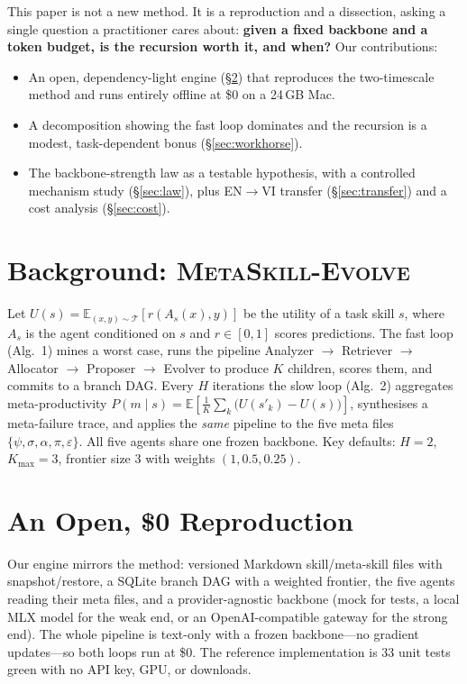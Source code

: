 \documentclass[11pt]{article}
\newcommand{\metaskill}{\textsc{MetaSkill-Evolve}}
\begin{document}
This paper is not a new method. It is a reproduction and a dissection, asking a
single question a practitioner cares about: \textbf{given a fixed backbone and a
token budget, is the recursion worth it, and when?} Our contributions:
\begin{itemize}
  \item An open, dependency-light engine (\S\ref{sec:engine}) that reproduces the
  two-timescale method and runs entirely offline at \$0 on a 24\,GB Mac.
  \item A decomposition showing the fast loop dominates and the recursion is a
  modest, task-dependent bonus (\S\ref{sec:workhorse}).
  \item The backbone-strength law as a testable hypothesis, with a controlled
  mechanism study (\S\ref{sec:law}), plus EN$\rightarrow$VI transfer
  (\S\ref{sec:transfer}) and a cost analysis (\S\ref{sec:cost}).
\end{itemize}

\section{Background: \metaskill{}}
Let $U(s)=\mathbb{E}_{(x,y)\sim\mathcal{T}}[r(A_s(x),y)]$ be the utility of a task
skill $s$, where $A_s$ is the agent conditioned on $s$ and $r\in[0,1]$ scores
predictions. The fast loop (Alg.~1) mines a worst case, runs the pipeline
Analyzer $\to$ Retriever $\to$ Allocator $\to$ Proposer $\to$ Evolver to produce
$K$ children, scores them, and commits to a branch DAG. Every $H$ iterations the
slow loop (Alg.~2) aggregates meta-productivity
$P(m\mid s)=\mathbb{E}\!\left[\tfrac{1}{K}\sum_{k}\big(U(s'_k)-U(s)\big)\right]$,
synthesises a meta-failure trace, and applies the \emph{same} pipeline to the five
meta files $\{\psi,\sigma,\alpha,\pi,\varepsilon\}$. All five agents share one
frozen backbone. Key defaults: $H{=}2$, $K_{\max}{=}3$, frontier size $3$ with
weights $(1,0.5,0.25)$.

\section{An Open, \$0 Reproduction}\label{sec:engine}
Our engine mirrors the method: versioned Markdown skill/meta-skill files with
snapshot/restore, a SQLite branch DAG with a weighted frontier, the five agents
reading their meta files, and a provider-agnostic backbone (mock for tests, a
local MLX model for the weak end, or an OpenAI-compatible gateway for the strong
end). The whole pipeline is text-only with a frozen backbone---no gradient
updates---so both loops run at \$0. The reference implementation is 33 unit tests
green with no API key, GPU, or downloads.
\end{document}
